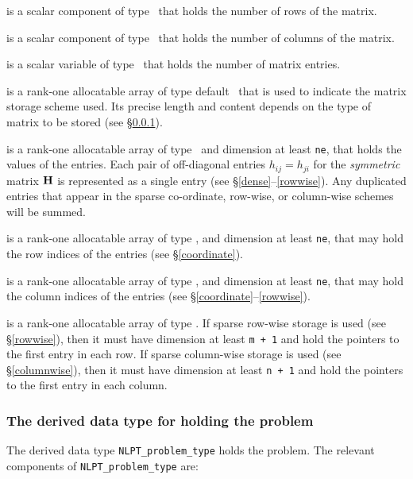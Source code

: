 \documentclass{galahad}
\begin{document}
\begin{description}

 is a scalar component of type \integer\ 
that holds the number of rows of the matrix. 

 is a scalar component of type \integer\ 
that holds the number of columns of the matrix. 
 
 is a scalar variable of type \integer\ that
holds the number of matrix entries.

 is a rank-one allocatable array of type default \character\ that
is used to indicate the matrix storage scheme used. Its precise length and
content depends on the type of matrix to be stored (see \S\ref{typeprob}).

\ittf{val} is a rank-one allocatable array of type \realdp\, 
and dimension at least {\tt ne}, that holds the values of the entries. 
Each pair of off-diagonal entries $h_{ij} = h_{ji}$ for the {\em symmetric}
matrix ${\mathbf{H}}$ is represented as a single entry 
(see \S\ref{dense}--\ref{rowwise}).
Any duplicated entries that appear in the sparse 
co-ordinate, row-wise, or column-wise schemes will be summed. 

 is a rank-one allocatable array of type \integer, 
and dimension at least {\tt ne}, that may hold the row indices of the entries 
(see \S\ref{coordinate}).

 is a rank-one allocatable array of type \integer, 
and dimension at least {\tt ne}, that may hold the column indices of the entries
(see \S\ref{coordinate}--\ref{rowwise}).

 is a rank-one allocatable array of type \integer.
If sparse row-wise storage is used (see \S\ref{rowwise}), then it
must have dimension at least {\tt m + 1} and hold the pointers to
the first entry in each row.  If sparse column-wise storage is used (see \S\ref{columnwise}), then it
must have dimension at least {\tt n + 1} and hold the pointers to
the first entry in each column.   

\end{description}


\subsubsection{The derived data type for holding the problem}\label{typeprob}
The derived data type {\tt NLPT\_problem\_type} holds 
the problem. The relevant components of 
{\tt NLPT\_problem\_type} 
are:
\end{document}
